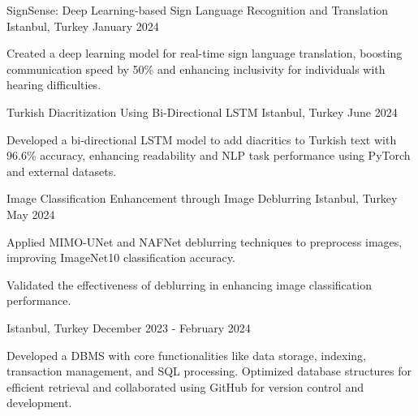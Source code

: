 \begin{cventries}
\cventry
    {} %
    {SignSense: Deep Learning-based Sign Language Recognition and Translation} %
    {Istanbul, Turkey} %
    {January 2024} %
    {
      \begin{cvitems} %
        \item {Created a deep learning model for real-time sign language translation, boosting communication speed by 50\% and enhancing inclusivity for individuals with hearing difficulties.}
      \end{cvitems}
    }


\cventry
    {} %
    {Turkish Diacritization Using Bi-Directional LSTM} %
    {Istanbul, Turkey} %
    {June 2024} %
    {
      \begin{cvitems} %
        \item {Developed a bi-directional LSTM model to add diacritics to Turkish text with 96.6\% accuracy, enhancing readability and NLP task performance using PyTorch and external datasets.}
      \end{cvitems}
    }

\cventry
    {} %
    {Image Classification Enhancement through Image Deblurring} %
    {Istanbul, Turkey} %
    {May 2024} %
    {
      \begin{cvitems} %
        \item {Applied MIMO-UNet and NAFNet deblurring techniques to preprocess images, improving ImageNet10 classification accuracy.}
        \item {Validated the effectiveness of deblurring in enhancing image classification performance.}
      \end{cvitems}
    }

\cventry
    {} %
    {\href{https://github.com/itudb2311/Database-Management-System}{\textbf{}}} %
    {Istanbul, Turkey} %
    {December 2023 - February 2024} %
    {
      \begin{cvitems} %
        \item {Developed a DBMS with core functionalities like data storage, indexing, transaction management, and SQL processing. Optimized database structures for efficient retrieval and collaborated using GitHub for version control and development.}
      \end{cvitems}
    }


\end{cventries}
